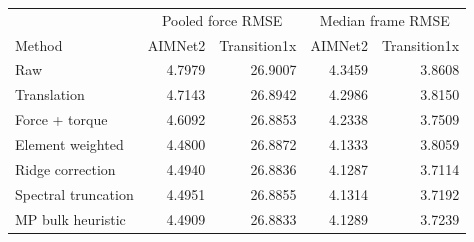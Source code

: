 \begin{tabular}{lrrrr}
\toprule
&\multicolumn{2}{c}{Pooled force RMSE}&\multicolumn{2}{c}{Median frame RMSE}\\
Method&AIMNet2&Transition1x&AIMNet2&Transition1x\\
\midrule
Raw & 4.7979 & 26.9007 & 4.3459 & 3.8608 \\
Translation & 4.7143 & 26.8942 & 4.2986 & 3.8150 \\
Force + torque & 4.6092 & 26.8853 & 4.2338 & 3.7509 \\
Element weighted & 4.4800 & 26.8872 & 4.1333 & 3.8059 \\
Ridge correction & 4.4940 & 26.8836 & 4.1287 & 3.7114 \\
Spectral truncation & 4.4951 & 26.8855 & 4.1314 & 3.7192 \\
MP bulk heuristic & 4.4909 & 26.8833 & 4.1289 & 3.7239 \\
\bottomrule
\end{tabular}
